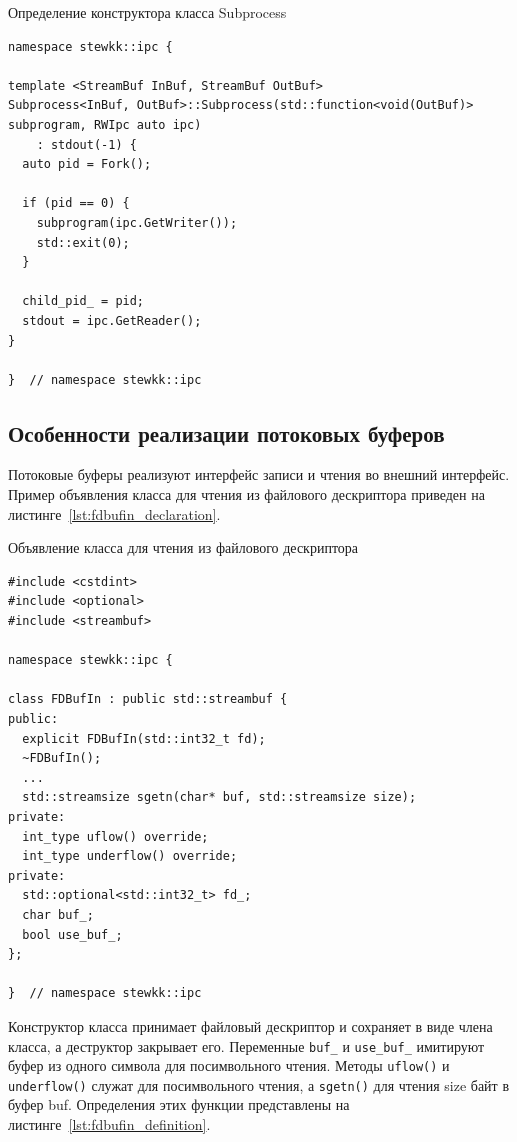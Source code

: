 \documentclass[14pt, russian]{scrartcl}
\begin{document}
\begin{listing}
  \caption{Определение конструктора класса Subprocess}
  \label{lst:subprocess_constructor}
  \begin{verbatim}
namespace stewkk::ipc {

template <StreamBuf InBuf, StreamBuf OutBuf>
Subprocess<InBuf, OutBuf>::Subprocess(std::function<void(OutBuf)> subprogram, RWIpc auto ipc)
    : stdout(-1) {
  auto pid = Fork();

  if (pid == 0) {
    subprogram(ipc.GetWriter());
    std::exit(0);
  }

  child_pid_ = pid;
  stdout = ipc.GetReader();
}

}  // namespace stewkk::ipc
  \end{verbatim}
\end{listing}

\subsection{Особенности реализации потоковых буферов}

Потоковые буферы реализуют интерфейс записи и чтения во внешний интерфейс.
Пример объявления класса для чтения из файлового дескриптора\cite{Poco} приведен
на листинге~\ref{lst:fdbufin_declaration}.

\begin{listing}
  \caption{Объявление класса для чтения из файлового дескриптора}
  \label{lst:fdbufin_declaration}
  \begin{verbatim}
#include <cstdint>
#include <optional>
#include <streambuf>

namespace stewkk::ipc {

class FDBufIn : public std::streambuf {
public:
  explicit FDBufIn(std::int32_t fd);
  ~FDBufIn();
  ...
  std::streamsize sgetn(char* buf, std::streamsize size);
private:
  int_type uflow() override;
  int_type underflow() override;
private:
  std::optional<std::int32_t> fd_;
  char buf_;
  bool use_buf_;
};

}  // namespace stewkk::ipc
  \end{verbatim}
\end{listing}

Конструктор класса принимает файловый дескриптор и сохраняет в виде члена
класса, а деструктор закрывает его. Переменные \verb|buf_| и \verb|use_buf_|
имитируют буфер из одного символа для посимвольного чтения. Методы
\verb|uflow()| и \verb|underflow()| служат для посимвольного чтения, а
\verb|sgetn()| для чтения size байт в буфер buf. Определения этих функции
представлены на листинге~\ref{lst:fdbufin_definition}.
\end{document}
